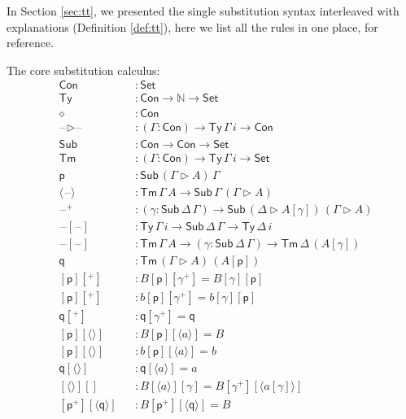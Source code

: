 \documentclass[submission,copyright,creativecommons]{eptcs}
\newcommand{\ra}{\rightarrow}
\newcommand{\Set}{\mathsf{Set}}
\newcommand{\Ty}{\mathsf{Ty}}
\newcommand{\Tm}{\mathsf{Tm}}
\newcommand{\Con}{\mathsf{Con}}
\newcommand{\Sub}{\mathsf{Sub}}
\newcommand{\p}{\mathsf{p}}
\newcommand{\q}{\mathsf{q}}
\newcommand{\ext}{\mathop{\triangleright}}
\newcommand{\N}{\mathbb{N}}
\newcommand{\blank}{\mathord{\hspace{1pt}\text{--}\hspace{1pt}}} %
\begin{document}
In Section \ref{sec:tt}, we presented the single substitution syntax
interleaved with explanations (Definition \ref{def:tt}), here we list
all the rules in one place, for reference.
\vspace{-0.5em}
\begin{multicols}{2}
\noindent The core substitution calculus:\vspace{-.5em}
\begin{alignat*}{10}
  & \Con && : \Set \\
  & \Ty && : \Con\ra\N\ra\Set \\
  & \diamond && : \Con \\
  & \blank\ext\blank && : (\Gamma:\Con)\ra\Ty\,\Gamma\,i\ra\Con \\
  & \Sub && : \Con\ra\Con\ra\Set \\
  & \Tm && : (\Gamma:\Con)\ra\Ty\,\Gamma\,i\ra\Set \\
  & \p && : \Sub\,(\Gamma\ext A)\,\Gamma \\
  & \langle\blank\rangle && : \Tm\,\Gamma\,A\ra\Sub\,\Gamma\,(\Gamma\ext A) \\
  & \blank^+ && : (\gamma:\Sub\,\Delta\,\Gamma)\ra\Sub\,(\Delta\ext A[\gamma])\,(\Gamma\ext A) \\
  & \blank[\blank] && : \Ty\,\Gamma\,i\ra\Sub\,\Delta\,\Gamma\ra\Ty\,\Delta\,i \\
  & \blank[\blank] && : \Tm\,\Gamma\,A\ra(\gamma:\Sub\,\Delta\,\Gamma)\ra\Tm\,\Delta\,(A[\gamma]) \\
  & \q && : \Tm\,(\Gamma\ext A)\,(A[\p]) \\
  & [\p][^+] && : B[\p][\gamma^+] = B[\gamma][\p] \\
  & [\p][^+] && : b[\p][\gamma^+] = b[\gamma][\p] \\
  & \q[^+] && : \q[\gamma^+] = \q \\
  & [\p][\langle\rangle] && : B[\p][\langle a\rangle] = B \\
  & [\p][\langle\rangle] && : b[\p ][\langle a\rangle] = b \\
  & \q[\langle\rangle] && : \q[\langle a\rangle] = a \\
  & [\langle\rangle][] && : B[\langle a\rangle][\gamma] = B[\gamma^+][\langle a[\gamma]\rangle] \\
  & [\p^+][\langle\q\rangle] && : B[\p^+][\langle\q\rangle] = B
\end{alignat*}


\end{multicols}
\end{document}
